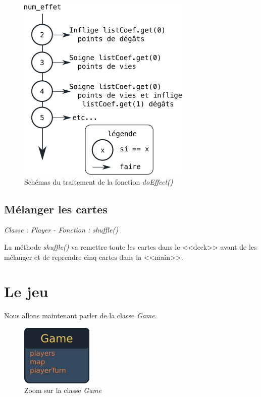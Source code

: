 \documentclass[a4paper,11pt]{report}
\begin{document}
         \begin{figure}[th]
          \begin{center}
            \includegraphics[scale=0.5]{Assets/decisionEffet.png}
            \caption{Schémas du traitement de la fonction \textit{doEffect()}}
            \label{decisionEffet}
          \end{center}
        \end{figure}
      
          \subsection{Mélanger les cartes}
            \begin{center}
            \textit{Classe : Player - Fonction : shuffle()}
            \end{center}
              La méthode \textit{shuffle()} va remettre toute les cartes dans le <<deck>> avant de les mélanger et de reprendre cinq cartes dans la <<main>>.
            
    \section{Le jeu}
     Nous allons maintenant parler de la classe \textit{Game}.
      
     \begin{figure}[th]
        \begin{center}
          \includegraphics[scale=0.4]{Assets/UMLGame.png}
          \caption{Zoom sur la classe \textit{Game}}
          \label{figUMLGame}
        \end{center}
      \end{figure}
      
\end{document}
